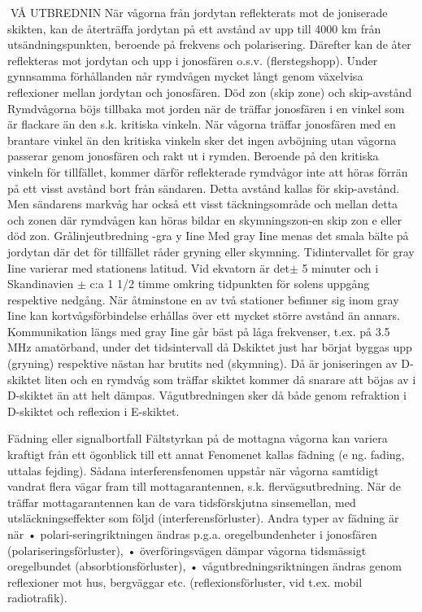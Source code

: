 \documentclass[a4paper,twoside,twocolumn,openright]{book}
\begin{document}
{{{{{VÅ UTBREDNIN
När vågorna från jordytan reflekterats
mot de joniserade skikten, kan de återträffa
jordytan på ett avstånd av upp till 4000 km
från utsändningspunkten, beroende på frekvens och polarisering. Därefter kan de åter
reflekteras mot jordytan och upp i jonosfären o.s.v. (flerstegshopp). Under gynnsamma förhållanden når rymdvågen mycket
långt genom växelvisa reflexioner mellan
jordytan och jonosfären.
Död zon (skip zone) och skip-avstånd
Rymdvågorna böjs tillbaka mot jorden när
de träffar jonosfären i en vinkel som är
flackare än den s.k. kritiska vinkeln. När
vågorna träffar jonosfären med en brantare
vinkel än den kritiska vinkeln sker det ingen
avböjning utan vågorna passerar genom
jonosfären och rakt ut i rymden. Beroende
på den kritiska vinkeln för tillfället, kommer
därför reflekterade rymdvågor inte att höras
förrän på ett visst avstånd bort från sändaren. Detta avstånd kallas för skip-avstånd.
Men sändarens markvåg har också ett
visst täckningsområde och mellan detta och
zonen där rymdvågen kan höras bildar en
skymningszon-en skip zon e eller död zon.
Grålinjeutbredning -gra y Iine
Med gray Iine menas det smala bälte på
jordytan där det för tillfället råder gryning
eller skymning.
Tidintervallet för gray Iine varierar med
stationens latitud. Vid ekvatorn är det$\pm$ 5
minuter och i Skandinavien $\pm$ c:a 1 1/2
timme omkring tidpunkten för solens uppgång respektive nedgång.
När åtminstone en av två stationer befinner sig inom gray Iine kan kortvågsförbindelse erhållas över ett mycket större
avstånd än annars.
Kommunikation längs med gray Iine går
bäst på låga frekvenser, t.ex. på 3.5 MHz
amatörband, under det tidsintervall då Dskiktet just har börjat byggas upp (gryning)
respektive nästan har brutits ned (skymning). Då är joniseringen av D-skiktet liten
och en rymdvåg som träffar skiktet kommer
då snarare att böjas av i D-skiktet än att helt
dämpas. Vågutbredningen sker då både
genom refraktion i D-skiktet och reflexion i
E-skiktet.

Fädning eller signalbortfall
Fältstyrkan på de mottagna vågorna kan
variera kraftigt från ett ögonblick till ett annat
Fenomenet kallas fädning (e ng. fading, uttalas fejding).
Sådana interferensfenomen uppstår när
vågorna samtidigt vandrat flera vägar fram
till mottagarantennen, s.k. flervägsutbredning. När de träffar mottagarantennen kan
de vara tidsförskjutna sinsemellan, med utsläckningseffekter som följd (interferensförluster).
Andra typer av fädning är när
• polari-seringriktningen ändras p.g.a. oregelbundenheter i jonosfären (polariseringsförluster),
• överföringsvägen dämpar vågorna tidsmässigt oregelbundet (absorbtionsförluster),
• vågutbredningsriktningen ändras genom
reflexioner mot hus, bergväggar etc.
(reflexionsförluster, vid t.ex. mobil radiotrafik).

}}}}}
\end{document}
